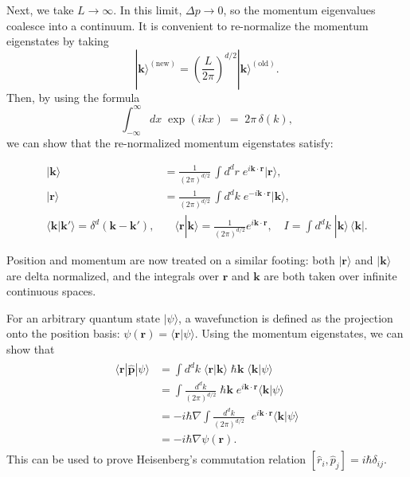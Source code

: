 \documentclass[pra,12pt]{revtex4}
\begin{document}
Next, we take $L \rightarrow \infty$.  In this limit, $\Delta p
\rightarrow 0$, so the momentum eigenvalues coalesce into a continuum.
It is convenient to re-normalize the momentum eigenstates by taking
\begin{equation}
  |\mathbf{k}\rangle^{(\textrm{new})} = \left(\frac{L}{2\pi}\right)^{d/2} |\mathbf{k}\rangle^{(\textrm{old})}.
\end{equation}
Then, by using the formula
\begin{equation}
  \int_{-\infty}^\infty dx\; \exp(ikx) \;=\; 2\pi\, \delta(k),
\end{equation}
we can show that the re-normalized momentum eigenstates satisfy:
\begin{framed}
  \begin{align}
      |\mathbf{k}\rangle &= \frac{1}{(2\pi)^{d/2}} \, \int d^dr \; e^{i\mathbf{k}\cdot\mathbf{r}} |\mathbf{r}\rangle, \\
      |\mathbf{r}\rangle &= \frac{1}{(2\pi)^{d/2}} \, \int d^dk \; e^{-i\mathbf{k}\cdot\mathbf{r}} |\mathbf{k}\rangle, \\
      \langle\mathbf{k}|\mathbf{k}'\rangle = \delta^d(\mathbf{k}-\mathbf{k}'),& \quad \langle\mathbf{r}|\mathbf{k}\rangle = \frac{1}{(2\pi)^{d/2}} e^{i\mathbf{k}\cdot\mathbf{r}}, \quad I = \int d^dk \;|\mathbf{k}\rangle\,\langle\mathbf{k}|.
  \end{align}
\end{framed}
\vskip -0.15in
\noindent
Position and momentum are now treated on a similar footing: both
$|\mathbf{r}\rangle$ and $|\mathbf{k}\rangle$ are delta normalized,
and the integrals over $\mathbf{r}$ and $\mathbf{k}$ are both taken
over infinite continuous spaces.

For an arbitrary quantum state $|\psi\rangle$, a wavefunction is
defined as the projection onto the position basis: $\psi(\mathbf{r}) =
\langle \mathbf{r}|\psi\rangle$.  Using the momentum eigenstates, we can
show that
\begin{align}
  \begin{aligned}\langle \mathbf{r}|\hat{\mathbf{p}}|\psi\rangle &=  \int d^dk \; \langle\mathbf{r}|\mathbf{k}\rangle \; \hbar\mathbf{k} \; \langle\mathbf{k}|\psi\rangle \\ &=  \int \frac{d^dk}{(2\pi)^{d/2}}\; \hbar\mathbf{k} \;e^{i\mathbf{k}\cdot\mathbf{r}} \langle\mathbf{k}|\psi\rangle \\ &=  -i\hbar\nabla \int \frac{d^dk}{(2\pi)^{d/2}}\; \;e^{i\mathbf{k}\cdot\mathbf{r}} \langle\mathbf{k}|\psi\rangle \\ &= -i\hbar \nabla\psi(\mathbf{r}).\end{aligned}
\end{align}
This can be used to prove Heisenberg's commutation relation
$[\hat{r}_i, \hat{p}_j] = i\hbar\delta_{ij}$.
\end{document}
